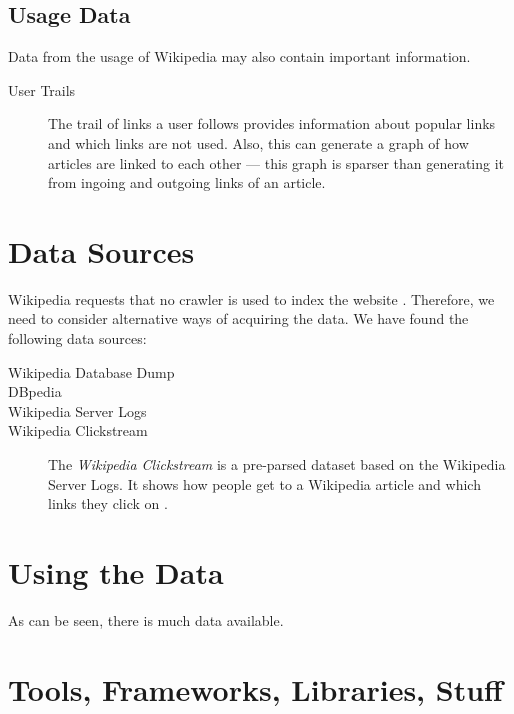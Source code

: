 \subsection{Usage Data}
Data from the usage of Wikipedia may also contain important information.
\begin{description}
  \item[User Trails] The trail of links a user follows provides information about popular links and which links are not used. Also, this can generate a graph of how articles are linked to each other --- this graph is sparser than generating it from ingoing and outgoing links of an article.
\end{description}

\section{Data Sources}\label{sec:datasources}
Wikipedia requests that no crawler is used to index the website . Therefore, we need to consider alternative ways of acquiring the data. We have found the following data sources:
\begin{description}
  \item[Wikipedia Database Dump]
  \item[DBpedia]
  \item[Wikipedia Server Logs] 
  \item[Wikipedia Clickstream] The \emph{Wikipedia Clickstream} is a pre-parsed dataset based on the Wikipedia Server Logs. It shows how people get to a Wikipedia article and which links they click on \cite{wiki-clickstream}.
\end{description}

\section{Using the Data}

As can be seen, there is much data available. 

\section{Tools, Frameworks, Libraries, Stuff}\label{sec:selecting_tools}

